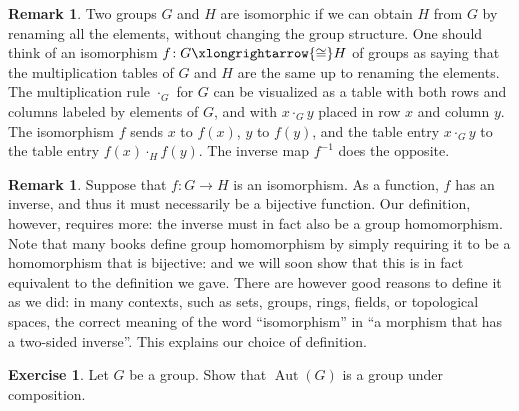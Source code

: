 \documentclass[12pt]{report}
\numberwithin{equation}{section}
\numberwithin{theorem}{chapter}
\theoremstyle{definition}
\newtheorem{exercise}{Exercise}
\newtheorem*{basic properties}{Basic Properties}
\newtheorem*{Important Remark}{Important Remark}
\newtheorem{remark}[theorem]{Remark}
\DeclareMathOperator{\Aut}{Aut}
\begin{document}
\begin{remark}
Two groups $G$ and $H$ are isomorphic if we can obtain $H$ from $G$ by renaming all the elements, without changing the group structure.
One should think of an isomorphism $f\!: G \xlongrightarrow{\cong} H$ of groups as saying that the multiplication tables of $G$ and $H$ are the same up to renaming the elements. The multiplication rule $\cdot_G$ for $G$ can be visualized as a table with both rows and columns labeled by elements of $G$, and with $x \cdot_G y$ placed in row $x$ and column $y$.
The isomorphism $f$ sends $x$ to $f(x)$, $y$ to $f(y)$, and the table entry $x \cdot_G y$ to the table entry $f(x) \cdot_H f(y)$. The inverse map $f^{-1}$ does the opposite.
\end{remark}



\begin{remark}\label{remark iso def}
	Suppose that $f\!: G \to H$ is an isomorphism. As a function, $f$ has an inverse, and thus it must necessarily be a bijective function. Our definition, however, requires more: the inverse must in fact also be a group homomorphism. Note that many books define group homomorphism by simply requiring it to be a homomorphism that is bijective: and we will soon show that this is in fact equivalent to the definition we gave. There are however good reasons to define it as we did: in many contexts, such as sets, groups, rings, fields, or topological spaces, the correct meaning of the word ``isomorphism'' in ``a morphism that has a two-sided inverse''. This explains our choice of definition.
\end{remark}



\begin{exercise}
	Let $G$ be a group. Show that $\Aut(G)$ is a group under composition.
\end{exercise}
\end{document}
